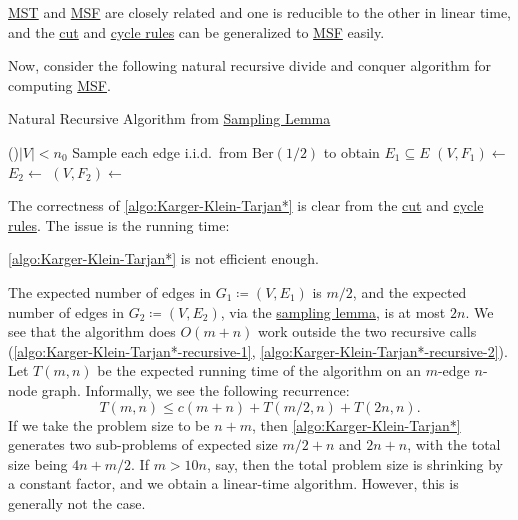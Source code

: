 \begin{note}
	\hyperref[prb:MST]{MST} and \hyperref[prb:MSF]{MSF} are closely related and one is reducible to the other in linear time, and the \hyperref[lma:cut-rule]{cut} and \hyperref[lma:cycle-rule]{cycle rules} can be generalized to \hyperref[prb:MSF]{MSF} easily.
\end{note}

Now, consider the following natural recursive divide and conquer algorithm for computing \hyperref[prb:MSF]{MSF}.

\begin{algorithm}[H]\label{algo:Karger-Klein-Tarjan*}
	\DontPrintSemicolon{}
	\caption{Natural Recursive Algorithm from \hyperref[lma:sampling]{Sampling Lemma}}
	\BlankLine
	\If(){\(\lvert V \rvert < n_0\)}{
	}
	\;
	Sample each edge i.i.d.\ from \(\mathrm{Ber} (1 / 2)\) to obtain \(E_1 \subseteq E\)\;
	\((V, F_1) \gets\)\label{algo:Karger-Klein-Tarjan*-recursive-1}
	\(E_2 \gets\)
	\((V, F_2) \gets\)\label{algo:Karger-Klein-Tarjan*-recursive-2}
	\;
\end{algorithm}

The correctness of \autoref{algo:Karger-Klein-Tarjan*} is clear from the \hyperref[lma:cut-rule]{cut} and \hyperref[lma:cycle-rule]{cycle rules}. The issue is the running time:

\begin{claim}
	\autoref{algo:Karger-Klein-Tarjan*} is not efficient enough.
\end{claim}
\begin{explanation}
	The expected number of edges in \(G_1 \coloneqq (V, E_1)\) is \(m / 2\), and the expected number of edges in \(G_2 \coloneqq (V, E_2)\), via the \hyperref[lma:sampling]{sampling lemma}, is at most \(2n\). We see that the algorithm does \(O(m + n)\) work outside the two recursive calls (\autoref{algo:Karger-Klein-Tarjan*-recursive-1}, \autoref{algo:Karger-Klein-Tarjan*-recursive-2}). Let \(T(m, n)\) be the expected running time of the algorithm on an \(m\)-edge \(n\)-node graph. Informally, we see the following recurrence:
	\[
		T(m, n)
		\leq c(m+n) + T(m / 2, n) + T(2n, n).
	\]
	If we take the problem size to be \(n + m\), then \autoref{algo:Karger-Klein-Tarjan*} generates two sub-problems of expected size \(m / 2 + n\) and \(2n + n\), with the total size being \(4n + m / 2\). If \(m > 10n\), say, then the total problem size is shrinking by a constant factor, and we obtain a linear-time algorithm. However, this is generally not the case.
\end{explanation}

